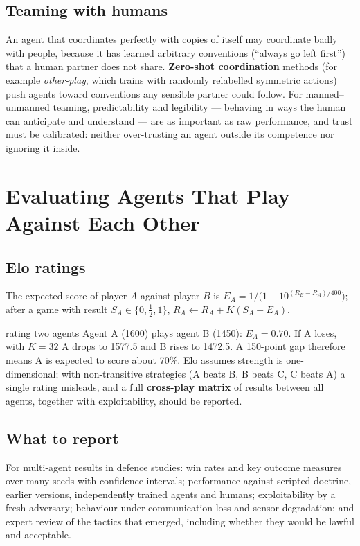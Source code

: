 \documentclass[11pt]{article}
\begin{document}
\subsection{Teaming with humans}
An agent that coordinates perfectly with copies of itself may coordinate badly with people, because it has learned arbitrary conventions (``always go left first'') that a human partner does not share. \textbf{Zero-shot coordination} methods (for example \emph{other-play}, which trains with randomly relabelled symmetric actions) push agents toward conventions any sensible partner could follow. For manned--unmanned teaming, predictability and legibility --- behaving in ways the human can anticipate and understand --- are as important as raw performance, and trust must be calibrated: neither over-trusting an agent outside its competence nor ignoring it inside.

\section{Evaluating Agents That Play Against Each Other}
\subsection{Elo ratings}
The expected score of player $A$ against player $B$ is $E_A=1/\big(1+10^{(R_B-R_A)/400}\big)$; after a game with result $S_A\in\{0,\tfrac12,1\}$, $R_A\leftarrow R_A+K(S_A-E_A)$.
\begin{example}{rating two agents}
Agent A (1600) plays agent B (1450): $E_A=0.70$. If A loses, with $K=32$ A drops to 1577.5 and B rises to 1472.5. A 150-point gap therefore means A is expected to score about 70\%. Elo assumes strength is one-dimensional; with non-transitive strategies (A beats B, B beats C, C beats A) a single rating misleads, and a full \textbf{cross-play matrix} of results between all agents, together with exploitability, should be reported.
\end{example}
\subsection{What to report}
For multi-agent results in defence studies: win rates and key outcome measures over many seeds with confidence intervals; performance against scripted doctrine, earlier versions, independently trained agents and humans; exploitability by a fresh adversary; behaviour under communication loss and sensor degradation; and expert review of the tactics that emerged, including whether they would be lawful and acceptable.
\end{document}
